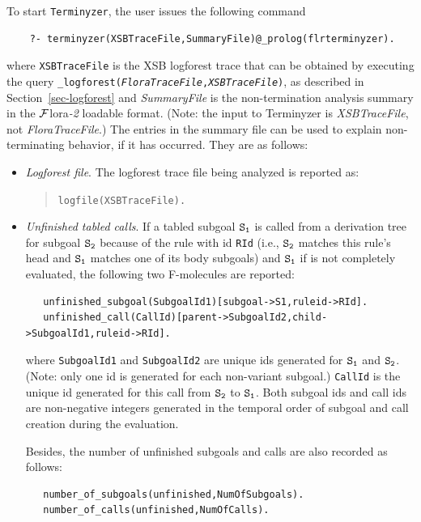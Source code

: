 \documentclass[11pt]{article}
\newcommand{\FLORA}{{\mbox{\sc ${\cal F}${lora}\rm\emph{-2}}}\xspace}
\begin{document}
To start \texttt{Terminyzer}, the user issues the following command
\begin{verbatim}
    ?- terminyzer(XSBTraceFile,SummaryFile)@_prolog(flrterminyzer).
\end{verbatim}
where {\tt XSBTraceFile} is the XSB logforest trace that can be
obtained by executing the query 
{\tt \_logforest(\emph{FloraTraceFile},\emph{XSBTraceFile})}, as described in
Section~\ref{sec-logforest} and \emph{SummaryFile} is the non-termination
analysis summary in the \FLORA loadable format.  (Note: the input to
Terminyzer is \emph{XSBTraceFile}, not \emph{FloraTraceFile}.)   
The entries in the summary file can be used to explain non-terminating
behavior, if it has occurred. They are as follows:
\begin{itemize}
\item \emph{Logforest file}. The logforest trace file being analyzed
  is reported as:
  \begin{quote}
    {\tt logfile(XSBTraceFile).}
  \end{quote}

\item \emph{Unfinished tabled calls}.
  If a tabled subgoal $\tt S_1$
  is called from a
  derivation tree for subgoal $\tt S_2$ because of the rule with id
  {\tt RId} (i.e., $\tt S_2$ matches this rule's head and $\tt S_1$
  matches one of its body subgoals) and $\tt S_1$ if is not completely
  evaluated, the
  following two F-molecules are reported: 
\begin{verbatim}
   unfinished_subgoal(SubgoalId1)[subgoal->S1,ruleid->RId].
   unfinished_call(CallId)[parent->SubgoalId2,child->SubgoalId1,ruleid->RId].
\end{verbatim}
  where {\tt SubgoalId1} and {\tt SubgoalId2} are unique ids generated
  for $\tt S_1$ and $\tt S_2$. 
  (Note: only one id is generated for each non-variant subgoal.)
  {\tt CallId} is the unique id generated for this call from $\tt S_2$
  to $\tt S_1$. 
  Both subgoal ids and call ids are non-negative integers generated in the
  temporal order of subgoal and call creation during the evaluation.

  Besides, the number of unfinished subgoals and calls are also
  recorded as follows:
\begin{verbatim}
   number_of_subgoals(unfinished,NumOfSubgoals).
   number_of_calls(unfinished,NumOfCalls).
\end{verbatim}


\end{itemize}
\end{document}
